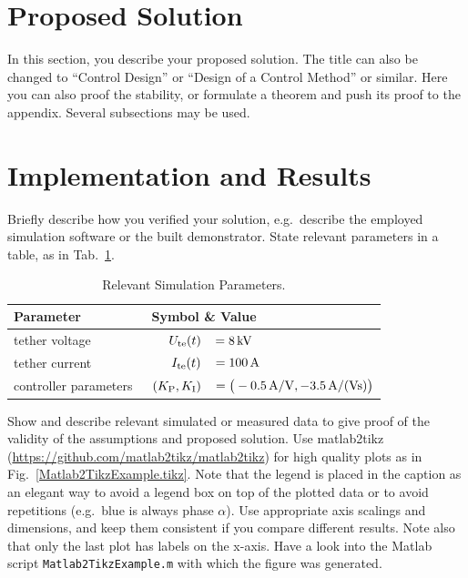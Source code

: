 \documentclass[journal]{IEEEtran}
\newcounter{assumption}
\renewcommand{\t}[1]{\text{\normalfont{#1}}} %
\begin{document}
\section{Proposed Solution}

In this section, you describe your proposed solution. The title can also be changed to “Control Design” or “Design of a Control Method” or similar. Here you can also proof the stability, or formulate a theorem and push its proof to the appendix. Several subsections may be used.


\section{Implementation and Results}

Briefly describe how you verified your solution, e.g.\ describe the employed simulation software or the built demonstrator. State relevant parameters in a table, as in Tab.~\ref{SimulationParameters}.

\begin{table}[h!]
		\setlength{\tabcolsep}{1pt}
		\centering
		\caption{Relevant Simulation Parameters.}
		\label{SimulationParameters}
		\begin{tabular}{lrl}
				\\\hline
								\textbf{Parameter}
						&
								\multicolumn{2}{l}{\textbf{Symbol \& Value}}
				\\\hline
								tether voltage
						&
								$U_\t{te}(t)$
						&
								$= \unit[8]{kV}$
				\\
								tether current
						&
								$I_\t{te}(t)$
						&
								$= \unit[100]{A}$
				\\
								controller parameters \,
						&
								$(K_\t{P}, K_\t{I})$
						&
								$= \big(\unit[-0.5]{A/V}, \unit[-3.5]{A/(Vs)}\big)$
				\\\hline
		\end{tabular}
\end{table}

Show and describe relevant simulated or measured data to give proof of the validity of the assumptions and proposed solution. Use matlab2tikz (\url{https://github.com/matlab2tikz/matlab2tikz}) for high quality plots as in Fig.~\ref{Matlab2TikzExample.tikz}. Note that the legend is placed in the caption as an elegant way to avoid a legend box on top of the plotted data or to avoid repetitions (e.g.\ blue is always phase $\alpha$). Use appropriate axis scalings and dimensions, and keep them consistent if you compare different results. Note also that only the last plot has labels on the x-axis. Have a look into the Matlab script \texttt{Matlab2TikzExample.m} with which the figure was generated.
\end{document}
